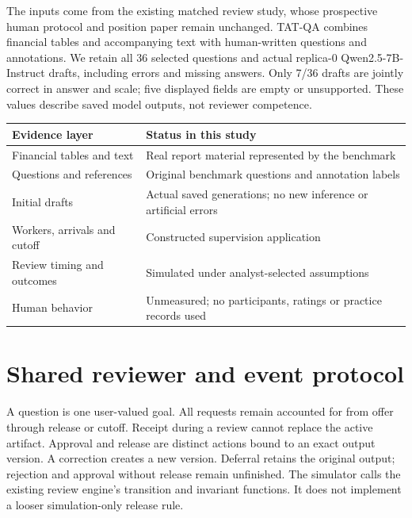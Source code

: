 \documentclass[10pt,a4paper]{article}
\begin{document}
The inputs come from the existing matched review study, whose prospective human
protocol and position paper remain unchanged. TAT-QA combines financial tables
and accompanying text with human-written questions and annotations\cite{tatqa}.
We retain all 36 selected questions and actual replica-0 Qwen2.5-7B-Instruct drafts,
including errors and missing answers. Only 7/36 drafts are jointly correct in
answer and scale; five displayed fields are empty or unsupported. These values
describe saved model outputs, not reviewer competence.

\begin{center}
\small
\begin{tabular}{p{.27\linewidth}p{.66\linewidth}}
\toprule
Evidence layer & Status in this study\\\midrule
Financial tables and text & Real report material represented by the benchmark\\
Questions and references & Original benchmark questions and annotation labels\\
Initial drafts & Actual saved generations; no new inference or artificial errors\\
Workers, arrivals and cutoff & Constructed supervision application\\
Review timing and outcomes & Simulated under analyst-selected assumptions\\
Human behavior & Unmeasured; no participants, ratings or practice records used\\\bottomrule
\end{tabular}
\end{center}

\clearpage
\section{Shared reviewer and event protocol}
A question is one user-valued goal. All requests remain accounted for from offer
through release or cutoff. Receipt during a review cannot replace the active
artifact. Approval and release are distinct actions bound to an exact output
version. A correction creates a new version. Deferral retains the original output;
rejection and approval without release remain unfinished. The simulator calls the
existing review engine's transition and invariant functions. It does not implement
a looser simulation-only release rule.
\end{document}

